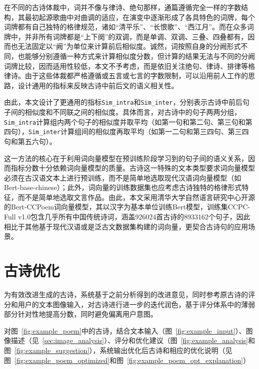在不同的古诗体裁中，词并不像与律诗、绝句那样，通篇遵循完全一样的字数结构，其最初起源歌曲中对曲调的适应，在演变中逐渐形成了各具特色的词牌，每个词牌都有自己独特的格律规范，诸如“清平乐”、“长恨歌”、“西江月”。而在众多词牌中，并非所有词牌都是“上下阕”的双调，而是单调、双调、三叠、四叠都有，因而也无法固定以“阙”为单位来计算前后相似度。诚然，词按照自身的分阙形式不同，也能够分别遵循一种方式来计算相似度分数，但计算的结果无法与不同的分阙词牌比较，因而适用性较低，本文不予考虑，而是依旧关注绝句、律诗、排律等格律诗。由于这些体裁都严格遵循或五言或七言的字数限制，可以沿用前人工作的思路，设计通用的指标来反映古诗中前后文的语义相关性。

由此，本文设计了更通用的指标\verb|Sim_intra|和\verb|Sim_inter|，分别表示古诗中前后句子间的相似度和不同联之间的相似度。具体而言，对古诗中的句子两两分组，\verb|Sim_intra|计算组内两个句子的相似度并取平均（如第一句和第二句、第三句和第四句），\verb|Sim_inter|计算组间的相似度再取平均（如第一二句和第三四句、第三四句和第五六句）。

这一方法的核心在于利用词向量模型在预训练阶段学习到的句子间的语义关系，因而指标分数十分依赖词向量模型的质量。古诗这一特殊的文本类型要求词向量模型必须在古汉语文本上进行预训练，而不是简单地选取现代汉语词向量模型（如Bert-base-chinese）；此外，词向量的训练数据集也应考虑古诗独特的格律形式特征，而不是简单地选取文言作品。由此，本文采用清华大学自然语言研究中心开源的Bert-CCPoem词向量模型，其以汉字为基本单位训练Bert模型，训练集CCPC-Full v1.0包含几乎所有中国传统诗词，涵盖926024首古诗的8933162个句子，因此相比于其他基于现代汉语或是泛古文数据集构建的词向量，更契合古诗句的应用场景。


\section{古诗优化}


为有效改进生成的古诗，系统基于之前分析得到的改进意见，同时参考原古诗的评分和用户的文本图像输入，对古诗进行进一步的迭代润色，基于评分体系中的薄弱部分针对性地提高分数，同时避免偏离用户意图。

对图~\ref{fig:example_poem}中的古诗，结合文本输入（图~\ref{fig:example_input}）、图像描述（见~\ref{sec:image_analysis}）、评分和优化建议（图~\ref{fig:example_analysis}和图~\ref{fig:example_suggestion}），系统输出优化后古诗和相应的优化说明（见图~\ref{fig:example_poem_optimized}和图~\ref{fig:example_poem_opt_explanation}）


